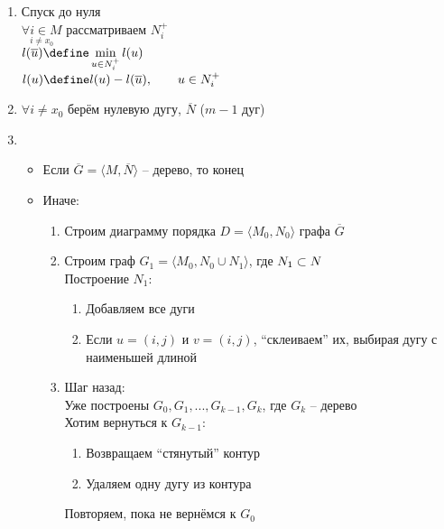 \begin{algorithm}
    \hfill
    \begin{enumerate}
    	\item Спуск до нуля \\
        $ \underset{i \ne x_0}{\forall i \in M} $ рассматриваем $ N_i^+ $ \\
        $ l(\overline{u}) \define \min\limits_{u \in N_i^+} l(u) $ \\
        $ l(u) \define l(u) - l(\overline{u}), \qquad u \in N_i^+ $
        \item $ \forall i \ne x_0 $ берём нулевую дугу, $ \overline{N} $ ($m - 1$ дуг)
        \item
        \begin{itemize}
        	\item Если $ \overline{G} = \langle M, \overline{N} \rangle $ -- дерево, то конец
            \item Иначе:
            \begin{enumerate}
                \item Строим диаграмму порядка $ D = \langle M_0, N_0 \rangle $ графа $ \overline{G} $
                \item Строим граф $ G_1 = \langle M_0, N_0 \cup N_1 \rangle $, где $ N_1 \subset N $ \\
                Построение $ N_1 $:
                \begin{enumerate}
                	\item Добавляем все дуги
                    \item Если $ u = (i, j) $ и $ v = (i, j) $, ``склеиваем'' их, выбирая дугу с наименьшей длиной
                \end{enumerate}
                \item Шаг назад: \\
                Уже построены $ G_0, G_1, ..., G_{k - 1}, G_k $, где $ G_k $ -- дерево \\
                Хотим вернуться к $ G_{k - 1} $:
                \begin{enumerate}
                	\item Возвращаем ``стянутый'' контур
                    \item Удаляем одну дугу из контура
                \end{enumerate}
                Повторяем, пока не вернёмся к $ G_0 $
            \end{enumerate}
        \end{itemize}
    \end{enumerate}
\end{algorithm}

